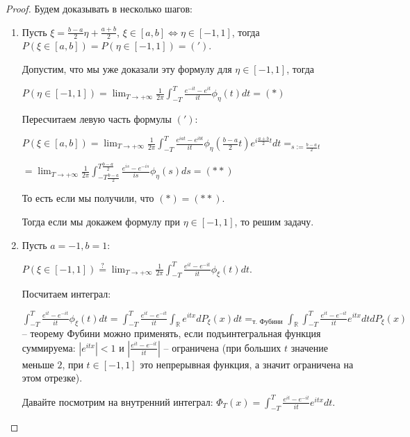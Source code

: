 \begin{proof}

    Будем доказывать в несколько шагов:

    \begin{enumerate}
        \item {
            Пусть $\xi = \frac{b - a}{2} \eta + \frac{a +  b}{2}$, $\xi \in [a, b] \Leftrightarrow \eta \in [-1, 1]$, тогда $P(\xi \in [a, b]) = P(\eta \in [-1, 1]) = (')$.

            Допустим, что мы уже доказали эту формулу для $\eta \in [-1, 1]$, тогда

            $P(\eta \in [-1, 1]) = \lim_{T \to +\infty} \frac{1}{2\pi} \int_{-T}^{T} \frac{e^{-it} - e^{i t}}{it} \phi_{\eta}(t) dt = (*)$

            Пересчитаем левую часть формулы $(')$:

            $P(\xi \in [a, b]) = \lim_{T \to +\infty} \frac{1}{2\pi} \int_{-T}^{T} \frac{e^{i a t} - e^{i b t}}{i t} \phi_{\eta} (\frac{b - a}{2} t) e^{i \frac{a + b}{2} t} dt =_{s := \frac{b - a}{2} t}$

            $= \lim_{T \to +\infty} \frac{1}{2 \pi} \int_{-T \frac{b - a}{2}}^{T \frac{b - a}{2}} \frac{e^{i s} - e^{-i s}}{is} \phi_{\eta}(s) ds = (**)$

            То есть если мы получили, что $(*) = (**)$.

            Тогда если мы докажем формулу при $\eta \in [-1, 1]$, то решим задачу.
        }
        \item {
            Пусть $a = -1, b = 1$:

            $P(\xi \in [-1, 1]) \overset{?}{=} \lim_{T \to +\infty} \frac{1}{2\pi} \int_{-T}^{T} \frac{e^{it} - e^{-it}}{it} \phi_{\xi}(t) dt$.

            Посчитаем интеграл:

            $\int_{-T}^{T} \frac{e^{it} - e^{-it}}{it} \phi_{\xi}(t) dt = \int_{-T}^{T} \frac{e^{it} - e^{-it}}{it} \int_{\mathbb{R}} e^{itx} dP_{\xi}(x) dt =_{\text{т. Фубини}} \int_{\mathbb{R}} \int_{-T}^{T} \frac{e^{it} - e^{-it}}{it} e^{i t x} dt dP_{\xi}(x)$ -- теорему Фубини можно применять, если подъинтегральная функция суммируема: $|e^{i t x}| < 1$ и $|\frac{e^{it} - e^{-it}}{it}|$ -- ограничена (при больших $t$ значение меньше $2$, при $t \in [-1, 1]$ это непрерывная функция, а значит ограничена на этом отрезке).

            Давайте посмотрим на внутренний интеграл: $\Phi_{T}(x) = \int_{-T}^{T} \frac{e^{it} - e^{-it}}{it} e^{it x} dt$.

}
\end{enumerate}
\end{proof}

